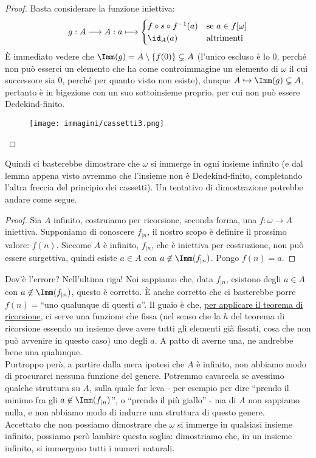 \documentclass[11pt]{scrartcl}
\begin{document}
\begin{proof}
	Basta considerare la funzione iniettiva:
	\[ g : A \longrightarrow A : a \longmapsto \begin{cases}
		f \circ s \circ f^{-1}(a) &\text{se $a \in f[\omega]$} \\
		\id_A(a) &\text{altrimenti}
	\end{cases}
		\]
	È immediato vedere che $\Imm(g) = A \setminus \{f(0)\} \subsetneq A$ (l'unico escluso è lo 0, perché non può esserci un elemento che ha come controimmagine un elemento di $\omega$ il cui
	successore sia 0, perché per quanto visto non esiste), dunque $A \hookrightarrow \Imm(g) \subsetneq A$, pertanto è in bigezione con un suo sottoinsieme proprio, per cui non può essere Dedekind-finito.
	\begin{figure}[H]
		\centering
		\texttt{[image: immagini/cassetti3.png]}
	\end{figure}
\end{proof}

Quindi ci basterebbe dimostrare che $\omega$ si immerge in ogni insieme infinito (e dal lemma appena visto avremmo che l'insieme non è Dedekind-finito, completando l'altra freccia del principio dei cassetti).
Un tentativo di dimostrazione potrebbe andare come segue.

\begin{proof}
	Sia $A$ infinito, costruiamo per ricorsione, seconda forma, una $f : \omega \rightarrow A$ iniettiva. Supponiamo di conoscere $f_{|n}$, il nostro scopo è definire il prossimo valore: $f(n)$.
	Siccome $A$ è infinito, $f_{|n}$, che è iniettiva per costruzione, non può essere surgettiva, quindi esiste $a \in A$ con $a \not \in \Imm(f_{|n})$. Pongo $f(n) = a$.
\end{proof}

Dov'è l'errore? Nell'ultima riga! Noi sappiamo che, data $f_{|n}$, esistono degli $a \in A$ con $a \not\in\Imm(f_{|n})$, questo è corretto. È anche corretto che ci basterebbe porre $f(n) =$``uno qualunque di questi $a$''.
Il guaio è che, \underline{per applicare il teorema di ricorsione}, ci serve una funzione che fissa (nel senso che la $h$ del teorema di ricorsione essendo un insieme deve avere tutti gli elementi già fissati, cosa che non può avvenire in questo caso) uno degli $a$. A patto di averne una, ne andrebbe bene una qualunque.\\
Purtroppo però, a partire dalla mera ipotesi che $A$ è infinito, non abbiamo modo di procurarci nessuna funzione del genere. Potremmo cavarcela se avessimo qualche struttura su $A$, sulla quale far leva - per esempio per dire ``prendo il minimo 
fra gli $a \not\in \Imm(f_{|n})$'', o ``prendo il più giallo'' - ma di $A$ non sappiamo nulla, e non abbiamo modo di indurre una struttura di questo genere.\\
Accettato che non possiamo dimostrare che $\omega$ si immerge in qualsiasi insieme infinito, possiamo però lambire questa soglia: dimostriamo che, in un insieme infinito, si immergono tutti i numeri naturali.
\end{document}
